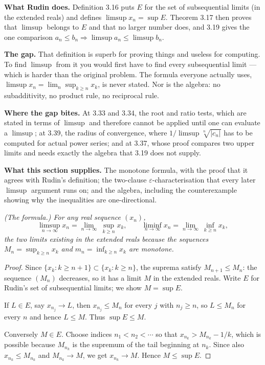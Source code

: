 
\begin{roadmap}
\raggedright
\textbf{What Rudin does.} Definition 3.16 puts $E$ for the set of
subsequential limits (in the extended reals) and defines
$\limsup x_n = \sup E$. Theorem 3.17 then proves that $\limsup$ belongs to
$E$ and that no larger number does, and 3.19 gives the one comparison
$a_n \le b_n \Rightarrow \limsup a_n \le \limsup b_n$.

\smallskip
\textbf{The gap.} That definition is superb for proving things and useless
for computing. To find $\limsup$ from it you would first have to find every
subsequential limit --- which is harder than the original problem. The
formula everyone actually uses, $\limsup x_n = \lim_n \sup_{k \ge n} x_k$,
is never stated. Nor is the algebra: no subadditivity, no product rule, no
reciprocal rule.

\smallskip
\textbf{Where the gap bites.} At 3.33 and 3.34, the root and ratio tests,
which are stated in terms of $\limsup$ and therefore cannot be applied until
one can evaluate a $\limsup$; at 3.39, the radius of convergence, where
$1/\limsup\sqrt[n]{|c_n|}$ has to be computed for actual power series; and at
3.37, whose proof compares two upper limits and needs exactly the algebra
that 3.19 does not supply.

\smallskip
\textbf{What this section supplies.} The monotone formula, with the proof
that it agrees with Rudin's definition; the two-clause
$\varepsilon$-characterisation that every later $\limsup$ argument runs on;
and the algebra, including the counterexample showing why the inequalities
are one-directional.
\end{roadmap}

\emph{(The formula.) For any real sequence $(x_n)$,}
\[ \limsup_{n\to\infty} x_n = \lim_{n\to\infty}\ \sup_{k \ge n} x_k,
   \qquad
   \liminf_{n\to\infty} x_n = \lim_{n\to\infty}\ \inf_{k \ge n} x_k, \]
\emph{the two limits existing in the extended reals because the sequences
$M_n = \sup_{k\ge n} x_k$ and $m_n = \inf_{k\ge n} x_k$ are monotone.}
\begin{proof}
Since $\{x_k : k \ge n+1\} \subset \{x_k : k \ge n\}$, the suprema satisfy
$M_{n+1} \le M_n$: the sequence $(M_n)$ decreases, so it has a limit $M$ in
the extended reals. Write $E$ for Rudin's set of subsequential limits; we
show $M = \sup E$.

If $L \in E$, say $x_{n_j} \to L$, then $x_{n_j} \le M_n$ for every $j$ with
$n_j \ge n$, so $L \le M_n$ for every $n$ and hence $L \le M$. Thus
$\sup E \le M$.

Conversely $M \in E$. Choose indices $n_1 < n_2 < \cdots$ so that
$x_{n_k} > M_{n_k} - 1/k$, which is possible because $M_{n_k}$ is the
supremum of the tail beginning at $n_k$. Since also $x_{n_k} \le M_{n_k}$
and $M_{n_k} \to M$, we get $x_{n_k} \to M$. Hence $M \le \sup E$.
\end{proof}


